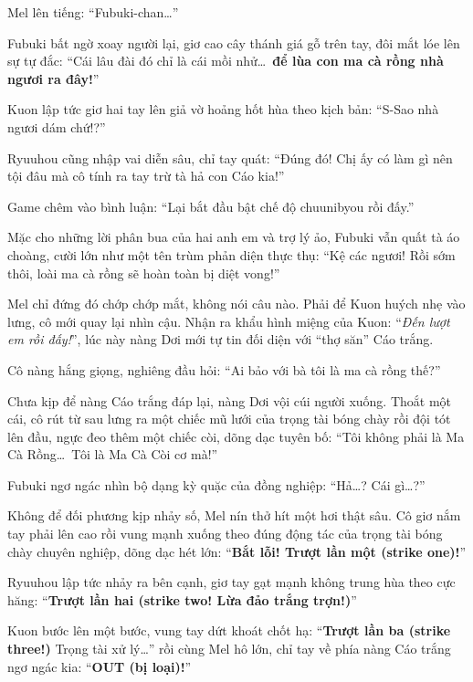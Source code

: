 \documentclass[../main.tex]{subfiles}
\begin{document}
Mel lên tiếng: ``Fubuki-chan\dots''

Fubuki bất ngờ xoay người lại, giơ cao cây thánh giá gỗ trên tay, đôi mắt lóe lên sự tự đắc: ``Cái lâu đài đó chỉ là cái mồi nhử\dots\ \textbf{để lùa con ma cà rồng nhà ngươi ra đây!}''


Kuon lập tức giơ hai tay lên giả vờ hoảng hốt hùa theo kịch bản: ``S-Sao nhà ngươi dám chứ!?''

Ryuuhou cũng nhập vai diễn sâu, chỉ tay quát: ``Đúng đó! Chị ấy có làm gì nên tội đâu mà cô tính ra tay trừ tà hả con Cáo kia!''

Game chêm vào bình luận: ``Lại bắt đầu bật chế độ chuunibyou rồi đấy.''

Mặc cho những lời phân bua của hai anh em và trợ lý ảo, Fubuki vẫn quất tà áo choàng, cười lớn như một tên trùm phản diện thực thụ: ``Kệ các ngươi! Rồi sớm thôi, loài ma cà rồng sẽ hoàn toàn bị diệt vong!''

Mel chỉ đứng đó chớp chớp mắt, không nói câu nào. Phải để Kuon huých nhẹ vào lưng, cô mới quay lại nhìn cậu. Nhận ra khẩu hình miệng của Kuon: ``\textit{Đến lượt em rồi đấy!}'', lúc này nàng Dơi mới tự tin đối diện với ``thợ săn'' Cáo trắng.

Cô nàng hắng giọng, nghiêng đầu hỏi: ``Ai bảo với bà tôi là ma cà rồng thế?''

Chưa kịp để nàng Cáo trắng đáp lại, nàng Dơi vội cúi người xuống. Thoắt một cái, cô rút từ sau lưng ra một chiếc mũ lưới của trọng tài bóng chày rồi đội tót lên đầu, ngực đeo thêm một chiếc còi, dõng dạc tuyên bố: ``Tôi không phải là Ma Cà Rồng\dots\ Tôi là Ma Cà Còi cơ mà!''


Fubuki ngơ ngác nhìn bộ dạng kỳ quặc của đồng nghiệp: ``Hả\dots? Cái gì\dots?''

Không để đối phương kịp nhảy số, Mel nín thở hít một hơi thật sâu. Cô giơ nắm tay phải lên cao rồi vung mạnh xuống theo đúng động tác của trọng tài bóng chày chuyên nghiệp, dõng dạc hét lớn: ``\textbf{Bắt lỗi! Trượt lần một (strike one)!}''

Ryuuhou lập tức nhảy ra bên cạnh, giơ tay gạt mạnh không trung hùa theo cực hăng: ``\textbf{Trượt lần hai (strike two! Lừa đảo trắng trợn!)}''

Kuon bước lên một bước, vung tay dứt khoát chốt hạ: ``\textbf{Trượt lần ba (strike three!)} Trọng tài xử lý\dots'' rồi cùng Mel hô lớn, chỉ tay về phía nàng Cáo trắng ngơ ngác kia: ``\textbf{OUT (bị loại)!}''
\end{document}
